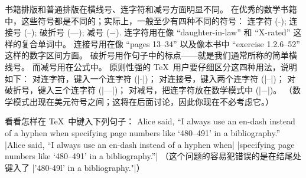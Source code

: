 \1书籍排版和普通排版在横线号、连字符和减号方面明显不同。
在优秀的数学书籍中，这些符号都是不同的；实际上，一般至少有四种不同的符号：
\begindisplay
连字符 (-);\cr
连接号 (--);\cr
破折号 (---);\cr
减号 ($-$).\cr
\enddisplay
连字符用在像 ``daughter-in-law'' 和 ``X-rated'' 这样的复合单词中。
连接号用在像 ``pages 13--34'' 以及像本书中 ``exercise 1.2.6--52''
这样的数字区间方面。
破折号用作句子中的标点——就是我们通常所称的简单横线号。
而减号用在公式中。
原则性强的 \TeX\ 用户要仔细区分这四种用法，说明如下：
\begindisplay
对连字符，键入一个连字符 (|-|)；\cr
对连接号，键入两个连字符 (|--|)；\cr
对破折号，键入三个连字符 (|---|)；\cr
对减号，把连字符放在数学模式中 (|$-$|)。\cr
\enddisplay
（数学模式出现在美元符号之间；这将在后面讨论，因此你现在不必考虑它。）

\exercise 看看怎样在 \TeX\ 中键入下列句子：
Alice said,
``I always use an en-dash instead of a hyphen when specifying page numbers
like `480--491' in a bibliography.''
\answer |Alice said, ``I always use an en-dash instead of a hyphen when|\break
|specifying page numbers like `480--491' in a bibliography.''|%
（这个问题的容易犯错误的是在结尾处键入了 |'480-49l' in a bibliography."|）

